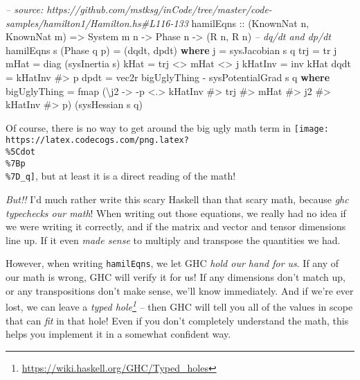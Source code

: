\documentclass[]{article}
\newenvironment{Shaded}{}{}
\newcommand{\KeywordTok}[1]{\textcolor[rgb]{0.00,0.44,0.13}{\textbf{#1}}}
\newcommand{\DataTypeTok}[1]{\textcolor[rgb]{0.56,0.13,0.00}{#1}}
\newcommand{\CommentTok}[1]{\textcolor[rgb]{0.38,0.63,0.69}{\textit{#1}}}
\newcommand{\OtherTok}[1]{\textcolor[rgb]{0.00,0.44,0.13}{#1}}
\newcommand{\FunctionTok}[1]{\textcolor[rgb]{0.02,0.16,0.49}{#1}}
\newcommand{\NormalTok}[1]{#1}
\renewcommand{\href}[2]{#2\footnote{\url{#1}}}
\begin{document}
\begin{Shaded}
\begin{Highlighting}[]
\CommentTok{-- source: https://github.com/mstksg/inCode/tree/master/code-samples/hamilton1/Hamilton.hs#L116-133}
\NormalTok{hamilEqns}
\OtherTok{    ::}\NormalTok{ (}\DataTypeTok{KnownNat}\NormalTok{ n, }\DataTypeTok{KnownNat}\NormalTok{ m)}
    \OtherTok{=>} \DataTypeTok{System}\NormalTok{ m n}
    \OtherTok{->} \DataTypeTok{Phase}\NormalTok{ n}
    \OtherTok{->}\NormalTok{ (}\DataTypeTok{R}\NormalTok{ n, }\DataTypeTok{R}\NormalTok{ n)       }\CommentTok{-- dq/dt and dp/dt}
\NormalTok{hamilEqns s (}\DataTypeTok{Phase}\NormalTok{ q p) }\FunctionTok{=}\NormalTok{ (dqdt, dpdt)}
  \KeywordTok{where}
\NormalTok{    j       }\FunctionTok{=}\NormalTok{ sysJacobian s q}
\NormalTok{    trj     }\FunctionTok{=}\NormalTok{ tr j}
\NormalTok{    mHat    }\FunctionTok{=}\NormalTok{ diag (sysInertia s)}
\NormalTok{    kHat    }\FunctionTok{=}\NormalTok{ trj }\FunctionTok{<>}\NormalTok{ mHat }\FunctionTok{<>}\NormalTok{ j}
\NormalTok{    kHatInv }\FunctionTok{=}\NormalTok{ inv kHat}
\NormalTok{    dqdt    }\FunctionTok{=}\NormalTok{ kHatInv }\FunctionTok{#>}\NormalTok{ p}
\NormalTok{    dpdt    }\FunctionTok{=}\NormalTok{ vec2r bigUglyThing }\FunctionTok{-}\NormalTok{ sysPotentialGrad s q}
      \KeywordTok{where}
\NormalTok{        bigUglyThing }\FunctionTok{=}
\NormalTok{          fmap (\textbackslash{}j2 }\OtherTok{->} \FunctionTok{-}\NormalTok{p }\FunctionTok{<.>}\NormalTok{ kHatInv }\FunctionTok{#>}\NormalTok{ trj }\FunctionTok{#>}\NormalTok{ mHat }\FunctionTok{#>}\NormalTok{ j2 }\FunctionTok{#>}\NormalTok{ kHatInv }\FunctionTok{#>}\NormalTok{ p)}
\NormalTok{               (sysHessian s q)}
\end{Highlighting}
\end{Shaded}

Of course, there is no way to get around the big ugly math term in
\texttt{[image: https://latex.codecogs.com/png.latex?\\\%5Cdot\\\%7Bp\\\%7D\_q]}, but
at least it is a direct reading of the math!

\emph{But!!} I'd much rather write this scary Haskell than that scary math,
because \emph{ghc typechecks our math}! When writing out those equations, we
really had no idea if we were writing it correctly, and if the matrix and vector
and tensor dimensions line up. If it even \emph{made sense} to multiply and
transpose the quantities we had.

However, when writing \texttt{hamilEqns}, we let GHC \emph{hold our hand for
us}. If any of our math is wrong, GHC will verify it for us! If any dimensions
don't match up, or any transpositions don't make sense, we'll know immediately.
And if we're ever lost, we can leave a
\emph{\href{https://wiki.haskell.org/GHC/Typed_holes}{typed hole}} -- then GHC
will tell you all of the values in scope that can \emph{fit} in that hole! Even
if you don't completely understand the math, this helps you implement it in a
somewhat confident way.
\end{document}
